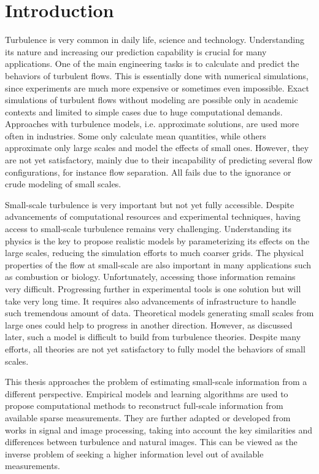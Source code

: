 \chapter*{Introduction}
\label{chap_motivation}

Turbulence is very common in daily life, science and technology. Understanding its nature and increasing our prediction capability is crucial for many applications. One of the main engineering tasks is to calculate and predict the behaviors of turbulent flows. This is essentially done with numerical simulations, since experiments are much more expensive or sometimes even impossible. Exact simulations of turbulent flows without modeling are possible only in academic contexts and limited to simple cases due to huge computational demands. Approaches with turbulence models, i.e. approximate solutions, are used more often in industries. Some only calculate mean quantities, while others approximate only large scales and model the effects of small ones. However, they are not yet satisfactory, mainly due to their incapability of predicting several flow configurations, for instance flow separation. All fails due to the ignorance or crude modeling of small scales.

Small-scale turbulence is very important but not yet fully accessible. Despite advancements of computational resources and experimental techniques, having access to small-scale turbulence remains very challenging. Understanding its physics is the key to propose realistic models by parameterizing its effects on the large scales, reducing the simulation efforts to much coarser grids. The physical properties of the flow at small-scale are also important in many applications such as combustion or biology. Unfortunately, accessing those information remains very difficult. Progressing further in experimental tools is one solution but will take very long time. It requires also advancements of infrastructure to handle such tremendous amount of data. Theoretical models generating small scales from large ones could help to progress in another direction. However, as discussed later, such a model is difficult to build from turbulence theories. Despite many efforts, all theories are not yet satisfactory to fully model the behaviors of small scales. 

This thesis approaches the problem of estimating small-scale information from a different perspective. Empirical models and learning algorithms are used to propose computational methods to reconstruct full-scale information from available sparse measurements. They are further adapted or developed from works in signal and image processing, taking into account the key similarities and differences between turbulence and natural images. This can be viewed as the inverse problem of seeking a higher information level out of available measurements.

